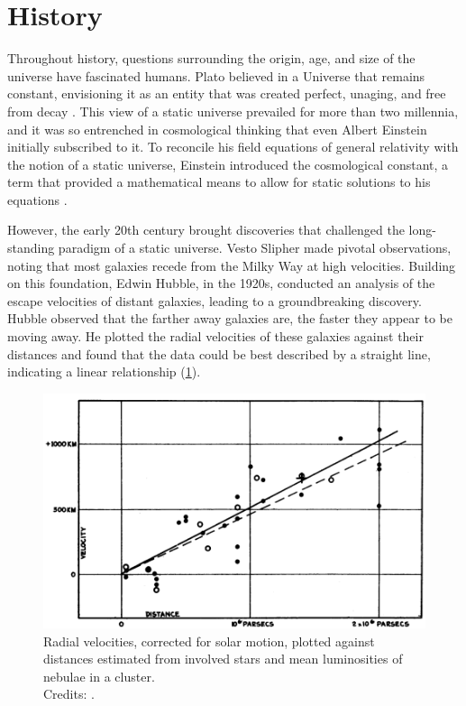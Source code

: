 \section{History}
\label{sec:history}
Throughout history, questions surrounding the origin, age, and size of the universe have fascinated humans. Plato believed in a Universe that remains constant, envisioning it as an entity that was created perfect, unaging, and free from decay \citep{cornford_platos_2010}. This view of a static universe prevailed for more than two millennia, and it was so entrenched in cosmological thinking that even Albert Einstein initially subscribed to it. To reconcile his field equations of general relativity with the notion of a static universe, Einstein introduced the cosmological constant, a term that provided a mathematical means to allow for static solutions to his equations \citep{einstein_kosmologische_1917}.

However, the early 20th century brought discoveries that challenged the long-standing paradigm of a static universe. Vesto Slipher made pivotal observations, noting that most galaxies recede from the Milky Way at high velocities. Building on this foundation, Edwin Hubble, in the 1920s, conducted an analysis of the escape velocities of distant galaxies, leading to a groundbreaking discovery. Hubble observed that the farther away galaxies are, the faster they appear to be moving away. He plotted the radial velocities of these galaxies against their distances and found that the data could be best described by a straight line, indicating a linear relationship (\cref{fig:hubble}).

\begin{figure}
    \centering
    \includegraphics[width=0.8\linewidth, keepaspectratio]{img//chapter1/hubble.png}
    \caption[Hubble's Law: radial velocities of Extra-Galactic Nebulae]{Radial velocities, corrected for solar motion, plotted against distances estimated from involved stars and mean luminosities of nebulae in a cluster.\\\small{Credits: \cite{hubble_relation_1929}.}}
    \label{fig:hubble}
\end{figure}

